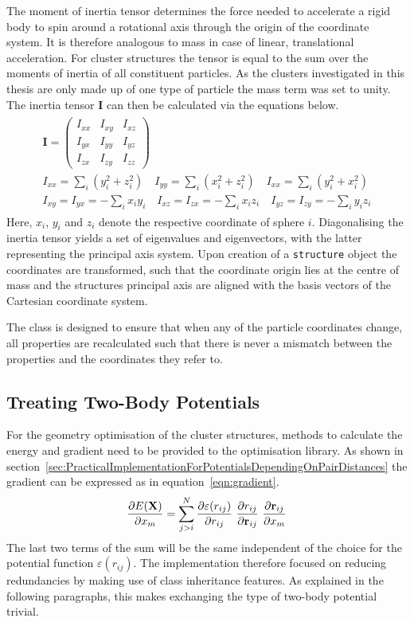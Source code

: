 The moment of inertia tensor determines the force needed to accelerate a rigid
body to spin around a rotational axis through the origin of the coordinate
system. It is therefore analogous to mass in case of linear, translational
acceleration. For cluster structures the tensor is equal to the sum over the
moments of inertia of all constituent particles. As the clusters investigated in
this thesis are only made up of one type of particle the mass term was set to
unity. The inertia tensor $\mathbf{I}$ can then be calculated via the equations
below.
%
\begin{gather}
    \begin{gathered}
    \mathbf{I}=
    \begin{pmatrix}
        I_{xx} & I_{xy} & I_{xz}\\
        I_{yx} & I_{yy} & I_{yz}\\
        I_{zx} & I_{zy} & I_{zz}
    \end{pmatrix}\\
    I_{xx}=\sum_i(y_i^2+z_i^2) \quad I_{yy}=\sum_i(x_i^2+z_i^2) \quad I_{xx}=\sum_i(y_i^2+x_i^2)\\
    I_{xy} = I_{yx} = -\sum_ix_iy_i \quad I_{xz} = I_{zx} = -\sum_ix_iz_i \quad I_{yz} = I_{zy} = -\sum_iy_iz_i
    \end{gathered}
\end{gather}
%
Here, $x_i$, $y_i$ and $z_i$ denote the respective coordinate of sphere $i$.
Diagonalising the inertia tensor yields a set of eigenvalues and eigenvectors,
with the latter representing the principal axis system. Upon creation of a
\verb|structure| object the coordinates are transformed, such that the
coordinate origin lies at the centre of mass and the structures principal axis
are aligned with the basis vectors of the Cartesian coordinate system.

The class is designed to ensure that when any of the particle coordinates
change, all properties are recalculated such that there is never a mismatch
between the properties and the coordinates they refer to.


\subsection{Treating Two-Body Potentials}
\label{sec:thepairpotentialclass}

For the geometry optimisation of the cluster structures, methods to calculate the
energy and gradient need to be provided to the optimisation library. As shown in
section~\ref{sec:PracticalImplementationForPotentialsDependingOnPairDistances}
the gradient can be expressed as in equation~\eqref{eqn:gradient}.
%
\begin{align}
    \pdv{E(\mathbf{X})}{x_m}=\sum_{j>i}^N\pdv{\varepsilon(r_{ij})}{r_{ij}}\ \pdv{r_{ij}}{\mathbf{r}_{ij}}\ \pdv{\mathbf{r}_{ij}}{x_m}\label{eqn:gradient}
\end{align}
%
The last two terms of the sum will be the same independent of the choice for the
potential function $\varepsilon(r_{ij})$. The implementation therefore 
focused on reducing redundancies by making use of class inheritance features. As
explained in the following paragraphs, this makes exchanging the type of
two-body potential trivial.

